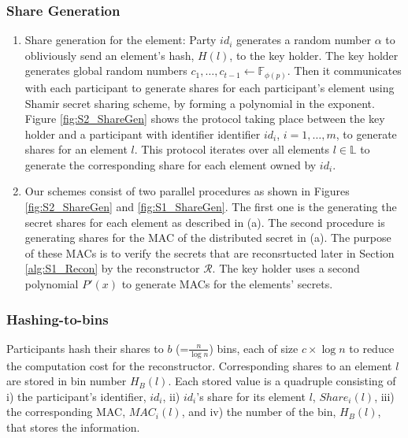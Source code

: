 \subsubsection{Share Generation}\label{ShareGen_S2}
\begin{enumerate}[label=(\alph*)]
    \item Share generation for the element: Party $id_i$ generates a random number $\alpha$ to obliviously send an element's hash, $H(l)$, to the key holder. The key holder generates global random numbers $c_1, \dots, c_{t-1} \gets \mathbb{F}_{\phi(p)}$. Then it communicates with each participant to generate shares for each participant's element using Shamir secret sharing scheme, by forming a polynomial in the exponent. Figure \ref{fig:S2_ShareGen} shows the protocol taking place between the key holder and a participant with identifier identifier $id_i$, $i =1, \dots, m$, to generate shares for an element $l$. This protocol iterates over all elements $l \in \mathbb{L}$ to generate the corresponding share for each element owned by $id_i$.
    \item Our schemes consist of two parallel procedures as shown in Figures \ref{fig:S2_ShareGen} and \ref{fig:S1_ShareGen}. The first one is the generating the secret shares for each element as described in (a). The second procedure is generating shares for the MAC of the distributed secret in (a). The purpose of these MACs is to verify the secrets that are reconsrtucted later in Section \ref{alg:S1_Recon} by the reconstructor $\mathcal{R}$. The key holder uses a second polynomial $P'(x)$ to generate MACs for the elements' secrets. 
\end{enumerate}

\subsubsection{Hashing-to-bins}\label{Binning_S2} 
Participants hash their shares to $b$ (=$\frac{n}{\log{n}}$) bins, each of size $c\times \log{n}$ to reduce the computation cost for the reconstructor. Corresponding shares to an element $l$ are stored in bin number $H_B(l)$. Each stored value is a quadruple consisting of i) the participant's identifier, $id_i$, ii) $id_i$'s share for its element $l$, $Share_i(l)$, iii) the corresponding MAC, $MAC_i(l)$, and iv) the number of the bin, $H_B(l)$, that stores the information.

